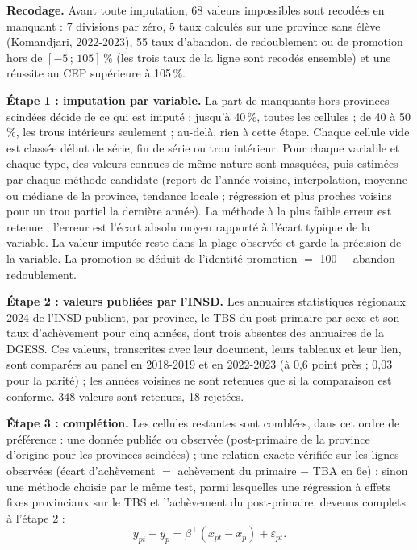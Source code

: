 \documentclass{article}
\begin{document}
\textbf{Recodage.} Avant toute imputation, 68 valeurs impossibles sont recodées en manquant : 7 divisions par zéro, 5 taux calculés sur une province sans élève (Komandjari, 2022-2023), 55 taux d'abandon, de redoublement ou de promotion hors de $[-5\,;\,105]$\,\% (les trois taux de la ligne sont recodés ensemble) et une réussite au CEP supérieure à 105\,\%.

\textbf{Étape 1 : imputation par variable.} La part de manquants hors provinces scindées décide de ce qui est imputé : jusqu'à 40\,\%, toutes les cellules ; de 40 à 50\,\%, les trous intérieurs seulement ; au-delà, rien à cette étape. Chaque cellule vide est classée début de série, fin de série ou trou intérieur. Pour chaque variable et chaque type, des valeurs connues de même nature sont masquées, puis estimées par chaque méthode candidate (report de l'année voisine, interpolation, moyenne ou médiane de la province, tendance locale ; régression et plus proches voisins pour un trou partiel la dernière année). La méthode à la plus faible erreur est retenue ; l'erreur est l'écart absolu moyen rapporté à l'écart typique de la variable. La valeur imputée reste dans la plage observée et garde la précision de la variable. La promotion se déduit de l'identité promotion $=$ 100 $-$ abandon $-$ redoublement.

\textbf{Étape 2 : valeurs publiées par l'INSD.} Les annuaires statistiques régionaux 2024 de l'INSD publient, par province, le TBS du post-primaire par sexe et son taux d'achèvement pour cinq années, dont trois absentes des annuaires de la DGESS. Ces valeurs, transcrites avec leur document, leurs tableaux et leur lien, sont comparées au panel en 2018-2019 et en 2022-2023 (à 0,6 point près ; 0,03 pour la parité) ; les années voisines ne sont retenues que si la comparaison est conforme. 348 valeurs sont retenues, 18 rejetées.

\textbf{Étape 3 : complétion.} Les cellules restantes sont comblées, dans cet ordre de préférence : une donnée publiée ou observée (post-primaire de la province d'origine pour les provinces scindées) ; une relation exacte vérifiée sur les lignes observées (écart d'achèvement $=$ achèvement du primaire $-$ TBA en 6e) ; sinon une méthode choisie par le même test, parmi lesquelles une régression à effets fixes provinciaux sur le TBS et l'achèvement du post-primaire, devenus complets à l'étape 2 :
\begin{equation}
y_{pt} - \bar{y}_p = \beta^\top (x_{pt} - \bar{x}_p) + \varepsilon_{pt}.
\end{equation}
\end{document}
